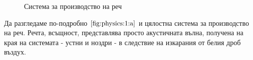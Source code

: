 \documentclass[12pt]{report}
\numberwithin{equation}{section}
\numberwithin{figure}{section}
\begin{document}
\begin{figure}[ht]
\begin{changemargin}{0cm}{0cm}
{                %
            }
        \end{changemargin} 
        \caption{Система за производство на реч}%
        \label{fig:physics:1}
    \end{figure}
    
    Да разгледаме по-подробно $\autoref{fig:physics:1:a}$ и цялостна система за производство на реч.
    Речта, всъщност, представлява просто акустичната вълна, получена на края на системата - устни и ноздри - в следствие на изкарания от белия дроб въздух.
\end{document}
